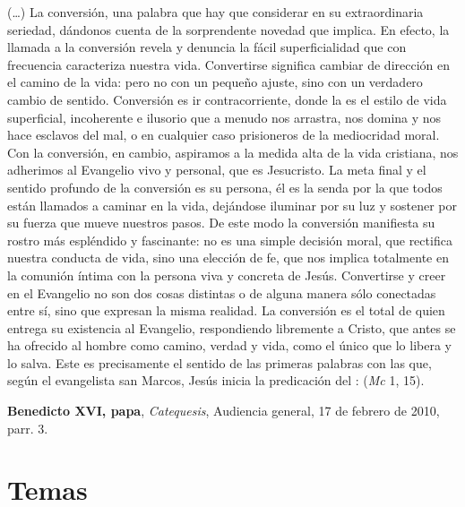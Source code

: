 \begin{patercite}
 (\ldots) La conversión, una palabra que hay que considerar en su extraordinaria seriedad, dándonos cuenta de la sorprendente novedad que implica. En efecto, la llamada a la conversión revela y denuncia la fácil superficialidad que con frecuencia caracteriza nuestra vida. Convertirse significa cambiar de dirección en el camino de la vida: pero no con un pequeño ajuste, sino con un verdadero cambio de sentido. Conversión es ir contracorriente, donde la  es el estilo de vida superficial, incoherente e ilusorio que a menudo nos arrastra, nos domina y nos hace esclavos del mal, o en cualquier caso prisioneros de la mediocridad moral. Con la conversión, en cambio, aspiramos a la medida alta de la vida cristiana, nos adherimos al Evangelio vivo y personal, que es Jesucristo. La meta final y el sentido profundo de la conversión es su persona, él es la senda por la que todos están llamados a caminar en la vida, dejándose iluminar por su luz y sostener por su fuerza que mueve nuestros pasos. De este modo la conversión manifiesta su rostro más espléndido y fascinante: no es una simple decisión moral, que rectifica nuestra conducta de vida, sino una elección de fe, que nos implica totalmente en la comunión íntima con la persona viva y concreta de Jesús. Convertirse y creer en el Evangelio no son dos cosas distintas o de alguna manera sólo conectadas entre sí, sino que expresan la misma realidad. La conversión es el  total de quien entrega su existencia al Evangelio, respondiendo libremente a Cristo, que antes se ha ofrecido al hombre como camino, verdad y vida, como el único que lo libera y lo salva. Este es precisamente el sentido de las primeras palabras con las que, según el evangelista san Marcos, Jesús inicia la predicación del :  (\textit{Mc} 1, 15).

\textbf{Benedicto XVI, papa}, \textit{Catequesis}, Audiencia general, 17 de febrero de 2010, parr. 3.
\end{patercite}

\newsection
\section{Temas}

 

